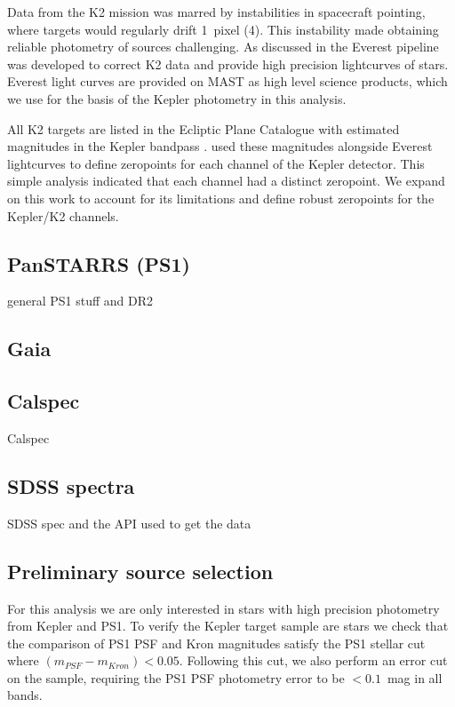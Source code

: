 \documentclass{aastex63}
\newcommand{\rr}[1]{{\bf \color{purple}{#1}}}
\begin{document}
Data from the K2 mission was marred by instabilities in spacecraft pointing, where targets would regularly drift 1~pixel (4\arcsec). This instability made obtaining reliable photometry of sources challenging. As discussed in \rr{ref} the Everest pipeline was developed to correct K2 data and provide high precision lightcurves of stars. Everest light curves are provided on MAST as high level science products, which we use for the basis of the Kepler photometry in this analysis.

All K2 targets are listed in the Ecliptic Plane Catalogue with estimated magnitudes in the Kepler bandpass \rr{ref}. \rr{cite self} used these magnitudes alongside Everest lightcurves to define zeropoints for each channel of the Kepler detector. This simple analysis indicated that each channel had a distinct zeropoint. We expand on this work to account for its limitations and define robust zeropoints for the Kepler/K2 channels.



\subsection{PanSTARRS (PS1)}
general PS1 stuff and DR2

\subsection{Gaia}

\subsection{Calspec}
Calspec

\subsection{SDSS spectra}
SDSS spec and the API used to get the data


\subsection{Preliminary source selection}
For this analysis we are only interested in stars with high precision photometry from Kepler and PS1. To verify the Kepler target sample are stars we check that the comparison of PS1 PSF and Kron magnitudes satisfy the PS1 stellar cut where $(m_{PSF} - m_{Kron}) < 0.05$. Following this cut, we also perform an error cut on the sample, requiring the PS1 PSF photometry error to be $<0.1$~mag in all bands. 
\end{document}
